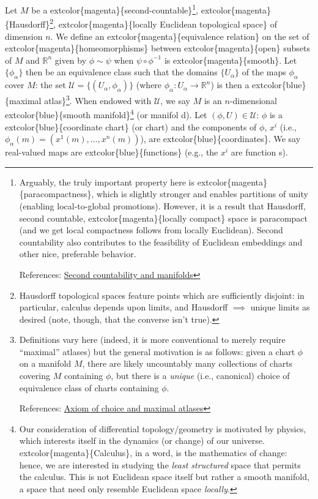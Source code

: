 \documentclass[
]{book}
\begin{document}
Let \(M\) be a extcolor\{magenta\}\{second-countable\}\footnote{Arguably, the truly important property here is extcolor\{magenta\}\{paracompactness\}, which is slightly stronger and enables partitions of unity (enabling local-to-global promotions).
  However, it is a result that Hausdorff, second countable, extcolor\{magenta\}\{locally compact\} space is paracompact (and we get local compactness follows from locally Euclidean).
  Second countability also contributes to the feasibility of Euclidean embeddings and other nice, preferable behavior.

  References: \href{https://math.stackexchange.com/questions/2131530/why-is-important-for-a-manifold-to-have-countable-basis}{Second countability and manifolds}}, extcolor\{magenta\}\{Hausdorff\}\footnote{Hausdorff topological spaces feature points which are sufficiently disjoint: in particular, calculus depends upon limits, and Hausdorff \(\implies\) unique limits as desired (note, though, that the converse isn't true).}, extcolor\{magenta\}\{locally Euclidean topological space\} of dimension \(n\). We define an extcolor\{magenta\}\{equivalence relation\} on the set of extcolor\{magenta\}\{homeomorphisms\} between extcolor\{magenta\}\{open\} subsets of \(M\) and \(\mathbb{R}^n\) given by \(\phi \sim \psi\) when \(\psi \circ \phi^{-1}\) is extcolor\{magenta\}\{smooth\}. Let \(\{\phi_\alpha\}\) then be an equivalence class such that the domains \(\{U_\alpha\}\) of the maps \(\phi_\alpha\) cover \(M\): the set \(\mathcal{U} = \{(U_\alpha, \phi_\alpha)\}\) (where \(\phi_\alpha : U_\alpha \to \mathbb{R}^n\)) is then a extcolor\{blue\}\{maximal atlas\}\footnote{Definitions vary here (indeed, it is more conventional to merely require ``maximal'' atlases) but the general motivation is as follows: given a chart \(\phi\) on a manifold \(M\), there are likely uncountably many collections of charts covering \(M\) containing \(\phi\), but there is a \emph{unique} (i.e., canonical) choice of equivalence class of charts containing \(\phi\).

  References: \href{https://math.stackexchange.com/questions/66554/is-zorns-lemma-required-to-prove-the-existence-of-a-maximal-atlas-on-a-manifold}{Axiom of choice and maximal atlases}}. When endowed with \(\mathcal{U}\), we say \(M\) is an \(n\)-dimensional extcolor\{blue\}\{smooth manifold\}\footnote{Our consideration of differential topology/geometry is motivated by physics, which interests itself in the dynamics (or change) of our universe.
  extcolor\{magenta\}\{Calculus\}, in a word, is the mathematics of change: hence, we are interested in studying the \emph{least structured} space that permits the calculus.
  This is not Euclidean space itself but rather a smooth manifold, a space that need only resemble Euclidean space \emph{locally}.} (or manifol
d). Let \((\phi, U) \in \mathcal{U}\): \(\phi\) is a extcolor\{blue\}\{coordinate chart\} (or chart) and the components of \(\phi\), \(x^i\) (i.e., \(\phi_\alpha(m) = (x^1(m), \dots, x^n(m))\)), are extcolor\{blue\}\{coordinates\}. We say real-valued maps are extcolor\{blue\}\{functions\} (e.g., the \(x^i\) are function
s).
\end{document}
